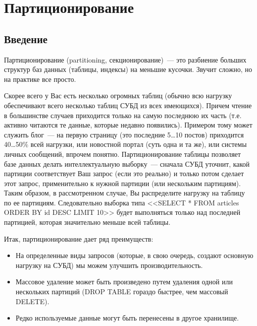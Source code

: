 \chapter{Партиционирование}
\begin{epigraphs}
\end{epigraphs}
\section{Введение}
Партиционирование (partitioning, секционирование)~--- это разбиение больших структур баз данных (таблицы, индексы) на меньшие кусочки. 
Звучит сложно, но на практике все просто.

Скорее всего у Вас есть несколько огромных таблиц (обычно всю нагрузку обеспечивают всего несколько таблиц СУБД из всех имеющихся). 
Причем чтение в большинстве случаев приходится только на самую последнюю их часть (т.е. активно читаются те данные, которые 
недавно появились). Примером тому может служить блог~--- на первую страницу (это последние 5\dots10 постов) приходится 40\dots50\% 
всей нагрузки, или новостной портал (суть одна и та же), или системы личных сообщений, впрочем понятно. Партиционирование 
таблицы позволяет базе данных делать интеллектуальную выборку~--- сначала СУБД уточнит, какой партиции соответствует Ваш запрос 
(если это реально) и только потом сделает этот запрос, применительно к нужной партиции (или нескольким партициям). Таким образом, 
в рассмотренном случае, Вы распределите нагрузку на таблицу по ее партициям. Следовательно выборка типа 
<<SELECT * FROM articles ORDER BY id DESC LIMIT 10>> будет выполняться только над последней партицией, которая значительно 
меньше всей таблицы.

Итак, партиционирование дает ряд преимуществ:
\begin{itemize}
\item На определенные виды запросов (которые, в свою очередь, создают основную нагрузку на СУБД) мы можем улучшить производительность.
\item Массовое удаление может быть произведено путем удаления одной или нескольких партиций 
(DROP TABLE гораздо быстрее, чем массовый DELETE).
\item Редко используемые данные могут быть перенесены в другое хранилище.
\end{itemize}

